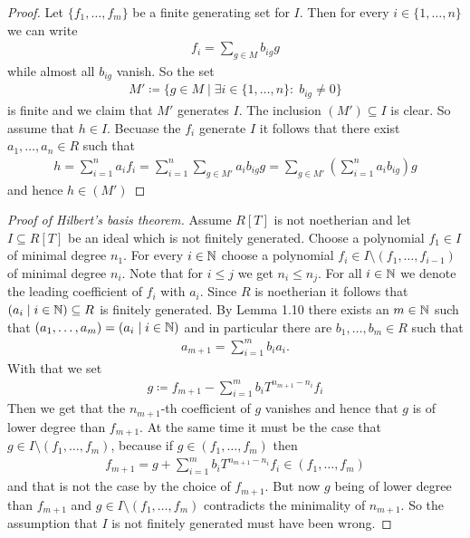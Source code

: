 \documentclass[../notes.tex]{subfiles}
\begin{document}
\begin{proof}
  Let $\{f_1, \dots, f_m\}$ be a finite generating set for $I$.
  Then for every $i \in \{1, \dots, n\}$ we can write
  \begin{align*}
    f_i = \sum_{g \in M} b_{ig} g
  \end{align*}
  while almost all $b_{ig}$ vanish. So the set
  \begin{align*}
    M' \coloneqq \{g \in M \mid \exists i \in \{1, \dots, n\}: \; b_{ig} \neq 0\}
  \end{align*}
  is finite and we claim that $M'$ generates $I$.
  The inclusion $(M') \subseteq I$ is clear. So assume that $h \in I$.
  Becuase the $f_i$ generate $I$ it follows that there exist $a_1, \dots, a_n \in R$ such that
  \begin{align*}
    h = \sum_{i = 1}^n a_i f_i = \sum_{i = 1}^n \sum_{g \in M'} a_i b_{ig} g
    =  \sum_{g \in M'} \left( \sum_{i = 1}^n a_i b_{ig} \right) g
  \end{align*}
  and hence $h \in (M')$
\end{proof}

\begin{proof}[Proof of Hilbert's basis theorem]
  Assume $R[T]$ is not noetherian and let $I \subseteq R[T]$ be an ideal which is not finitely
  generated. Choose a polynomial $f_1 \in I$ of minimal degree $n_1$. For every $i \in {\mathbb{N}}$
  choose a polynomial $f_i \in I \setminus (f_1, \dots, f_{i-1})$ of minimal degree $n_i$.
  Note that for $i \leq j$ we get $n_i \leq n_j$. For all $i \in {\mathbb{N}}$ we denote the leading
  coefficient of $f_i$ with $a_i$. Since $R$ is noetherian it follows that
  $(a_i \mid i \in {\mathbb{N}}) \subseteq R$ is finitely generated. By Lemma 1.10
  there exists an $m \in {\mathbb{N}}$ such that $(a_1, \dots, a_m) = (a_i \mid i \in {\mathbb{N}})$
  and in particular there are $b_1, \dots, b_m \in R$ such that
  \begin{align*}
    a_{m+1} = \sum_{i = 1}^m b_i a_i.
  \end{align*}
  With that we set
  \begin{align*}
    g \coloneqq f_{m+1} - \sum_{i = 1}^m b_i T^{n_{m+1} - n_i} f_i
  \end{align*}
  Then we get that the $n_{m+1}$-th coefficient of $g$ vanishes and hence that
  $g$ is of lower degree than $f_{m+1}$. At the same time it must be the case that
  $g \in I \setminus (f_1, \dots, f_m)$, because if $g \in (f_1, \dots, f_m)$
  then
  \begin{align*}
    f_{m+1} = g + \sum_{i = 1}^m b_i T^{n_{m+1} - n_i} f_i \in (f_1, \dots, f_m)
  \end{align*}
  and that is not the case by the choice of $f_{m+1}$. But now $g$ being of lower
  degree than $f_{m+1}$ and $g \in I \setminus (f_1, \dots, f_m)$ contradicts the
  minimality of $n_{m+1}$. So the assumption that $I$ is not finitely generated
  must have been wrong.

\end{proof}
\end{document}

